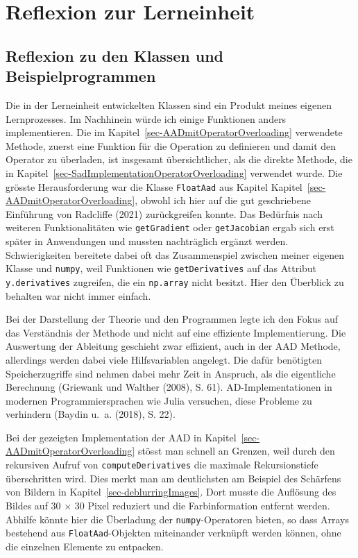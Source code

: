 \documentclass[
  a4paper,
  DIV=11]{scrreprt}
\theoremstyle{definition}
\theoremstyle{definition}
\theoremstyle{remark}
\begin{document}
\hypertarget{reflexion-zur-lerneinheit}{%
\section{Reflexion zur Lerneinheit}\label{reflexion-zur-lerneinheit}}

\hypertarget{reflexion-zu-den-klassen-und-beispielprogrammen}{%
\subsection{Reflexion zu den Klassen und
Beispielprogrammen}\label{reflexion-zu-den-klassen-und-beispielprogrammen}}

Die in der Lerneinheit entwickelten Klassen sind ein Produkt meines
eigenen Lernprozesses. Im Nachhinein würde ich einige Funktionen anders
implementieren. Die im Kapitel~\ref{sec-AADmitOperatorOverloading}
verwendete Methode, zuerst eine Funktion für die Operation zu definieren
und damit den Operator zu überladen, ist insgesamt übersichtlicher, als
die direkte Methode, die in
Kapitel~\ref{sec-SadImplementationOperatorOverloading} verwendet wurde.
Die grösste Herausforderung war die Klasse \texttt{FloatAad} aus Kapitel
Kapitel~\ref{sec-AADmitOperatorOverloading}, obwohl ich hier auf die gut
geschriebene Einführung von Radcliffe (2021) zurückgreifen konnte. Das
Bedürfnis nach weiteren Funktionalitäten wie \texttt{getGradient} oder
\texttt{getJacobian} ergab sich erst später in Anwendungen und mussten
nachträglich ergänzt werden. Schwierigkeiten bereitete dabei oft das
Zusammenspiel zwischen meiner eigenen Klasse und \texttt{numpy}, weil
Funktionen wie \texttt{getDerivatives} auf das Attribut
\texttt{y.derivatives} zugreifen, die ein \texttt{np.array} nicht
besitzt. Hier den Überblick zu behalten war nicht immer einfach.

Bei der Darstellung der Theorie und den Programmen legte ich den Fokus
auf das Verständnis der Methode und nicht auf eine effiziente
Implementierung. Die Auswertung der Ableitung geschieht zwar effizient,
auch in der AAD Methode, allerdings werden dabei viele Hilfsvariablen
angelegt. Die dafür benötigten Speicherzugriffe sind nehmen dabei mehr
Zeit in Anspruch, als die eigentliche Berechnung (Griewank und Walther
(2008), S. 61). AD-Implementationen in modernen Programmiersprachen wie
Julia versuchen, diese Probleme zu verhindern (Baydin u.~a. (2018), S.
22).

Bei der gezeigten Implementation der AAD in
Kapitel~\ref{sec-AADmitOperatorOverloading} stösst man schnell an
Grenzen, weil durch den rekursiven Aufruf von
\texttt{computeDerivatives} die maximale Rekursionstiefe überschritten
wird. Dies merkt man am deutlichsten am Beispiel des Schärfens von
Bildern in Kapitel~\ref{sec-deblurringImages}. Dort musste die Auflösung
des Bildes auf 30 \(\times\) 30 Pixel reduziert und die Farbinformation
entfernt werden. Abhilfe könnte hier die Überladung der
\texttt{numpy}-Operatoren bieten, so dass Arrays bestehend aus
\texttt{FloatAad}-Objekten miteinander verknüpft werden können, ohne die
einzelnen Elemente zu entpacken.
\end{document}
